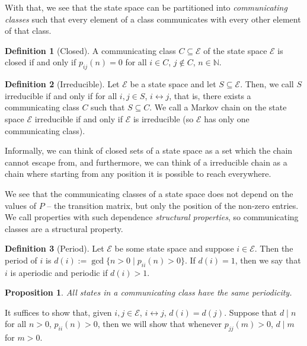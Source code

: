 \documentclass[
]{article}
\newtheorem{prop}{Proposition}[theorem]
\theoremstyle{definition}
\newtheorem{definition}{Definition}[section]
\begin{document}
With that, we see that the state space can be partitioned into
\emph{communicating classes} such that every element of a class
communicates with every other element of that class.

\begin{definition}[Closed]
  A communicating class \(C \subseteq \mathcal{E}\) of the state space 
  \(\mathcal{E}\) is closed if and only if \(p_{ij}(n) = 0\) for all \(i \in C\),
  \(j \not\in C\), \(n \in \mathbb{N}\).
\end{definition}

\begin{definition}[Irreducible]
  Let \(\mathcal{E}\) be a state space and let \(S \subseteq \mathcal{E}\). 
  Then, we call \(S\) irreducible if and only if for all \(i, j \in S\), 
  \(i \leftrightarrow j\), that is, there exists a communicating class \(C\) 
  such that \(S \subseteq C\). We call a Markov chain on the state space 
  \(\mathcal{E}\) irreducible if and only if \(\mathcal{E}\) is irreducible 
  (so \(\mathcal{E}\) has only one communicating class).
\end{definition}

Informally, we can think of closed sets of a state space as a set which
the chain cannot escape from, and furthermore, we can think of a
irreducible chain as a chain where starting from any position it is
possible to reach everywhere.

We see that the communicating classes of a state space does not depend
on the values of \(P\) -- the transition matrix, but only the position
of the non-zero entries. We call properties with such dependence
\emph{structural properties}, so communicating classes are a structural
property.

\begin{definition}[Period]
  Let \(\mathcal{E}\) be some state space and suppose \(i \in \mathcal{E}\). Then 
  the period of \(i\) is \(d(i) := \gcd \{n > 0 \mid p_{ii}(n) > 0\}\). 
  If \(d(i) = 1\), then we say that \(i\) is aperiodic and periodic if \(d(i) > 1\).
\end{definition}

\begin{prop}
  All states in a communicating class have the same periodicity.
\end{prop}
\proof

It suffices to show that, given \(i, j \in \mathcal{E}\),
\(i \leftrightarrow j\), \(d(i) = d(j)\). Suppose that \(d \mid n\) for
all \(n > 0\), \(p_{ii}(n) > 0\), then we will show that whenever
\(p_{jj}(m) > 0\), \(d \mid m\) for \(m > 0\).
\end{document}
